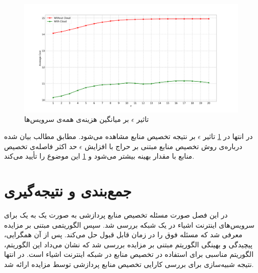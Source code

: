     \begin{figure}[H]
      \centerline{\includegraphics[width=17cm]{graphics/one_to_one/sim_5}}
      \caption{تاثیر $\epsilon$ بر میانگین هزینه‌ی همه‌ی سرویس‌ها}
      \label{fig:ono_to_one:sim5}
    \end{figure}

    در انتها در \cref{fig:ono_to_one:sim5} تاثیر $\epsilon$ بر نتیجه تخصیص منابع مشاهده می‌شود.
    مطابق مطالب بیان شده درباره‌ی روش تخصیص منابع مبتنی بر حراج با افزایش $\epsilon$ حد اکثر فاصله‌ی تخصیص منابع با مقدار بهینه بیشتر می‌شود و \cref{fig:ono_to_one:sim5} این موضوع را تأیید می‌کند.

  \section{جمع‌بندی و نتیجه‌گیری}
    در این فصل صورت مسئله تخصیص منابع پردازشی به صورت یک به یک برای سرویس‌های اینترنت اشیاء در یک شبکه بررسی شد.
    سپس الگوریتمی مبتنی بر مزایده معرفی  شد که مسئله فوق را در زمان قابل قبول حل می‌کند.
    پس از آن همگرایی، پیچیدگی و بهینگی الگوریتم مبتنی بر مزایده بررسی شد که نشان می‌داد این الگوریتم، الگوریتم مناسبی برای استفاده در تخصیص منابع در شبکه اینترنت اشیاء است.
    در انتها نتیجه شبیه‌سازی‌ برای بررسی کارایی تخصیص منابع پردازشی توسط مزایده ارائه شد.

